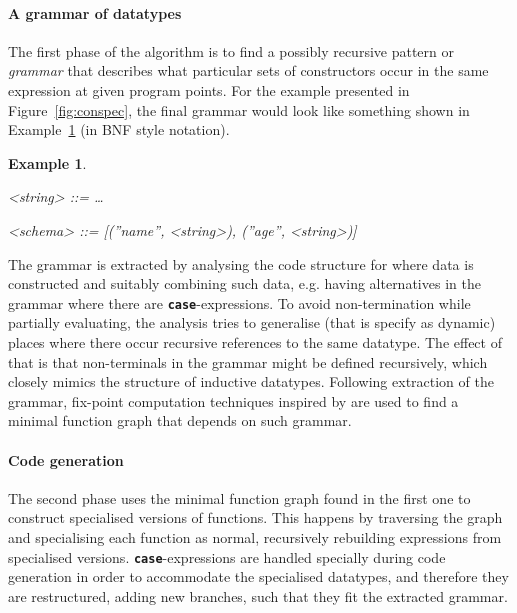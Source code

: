 \documentclass{ituthesis}
\theoremstyle{break}
\newtheorem{exmp}{Example}
\begin{document}
\paragraph{A grammar of datatypes}
\label{par:Findingaminimalgrammar}
The first phase of the algorithm is to find a possibly recursive pattern or \textit{grammar} that describes what particular sets of constructors occur in the same expression
at given program points. For the example presented in Figure~\ref{fig:conspec}, the final grammar would look like something shown in Example~\ref{exmp:grammarspec} (in BNF style notation).

\setlength{\grammarparsep}{12pt plus 1pt minus 1pt} %
\setlength{\grammarindent}{12em}
\begin{exmp}
  \begin{grammar}
    <string> ::= \ldots

    <schema> ::= [(''name'', <string>), (''age'', <string>)]
  \end{grammar}
  \label{exmp:grammarspec}
\end{exmp}

The grammar is extracted by analysing the code structure for where data is constructed and suitably combining such data, e.g. having alternatives in the grammar where there are \texttt{\textbf{case}}-expressions.
To avoid non-termination while partially evaluating, the analysis tries to generalise (that is specify as dynamic) places where there occur recursive references to the same datatype.
The effect of that is that non-terminals in the grammar might be defined recursively, which closely mimics the structure of inductive datatypes.
Following extraction of the grammar, fix-point computation techniques inspired by \textcite{Jones:1986:DFA:512644.512672} are used to find a minimal function graph that depends on such grammar.

\paragraph{Code generation}
\label{par:Code generation}
The second phase uses the minimal function graph found in the first one to construct specialised versions of functions.
This happens by traversing the graph and specialising each function as normal, recursively rebuilding expressions from specialised versions.
\texttt{\textbf{case}}-expressions are handled specially during code generation in order to accommodate the specialised datatypes, and therefore they are restructured, adding new branches, such that they fit the extracted grammar.
\end{document}
